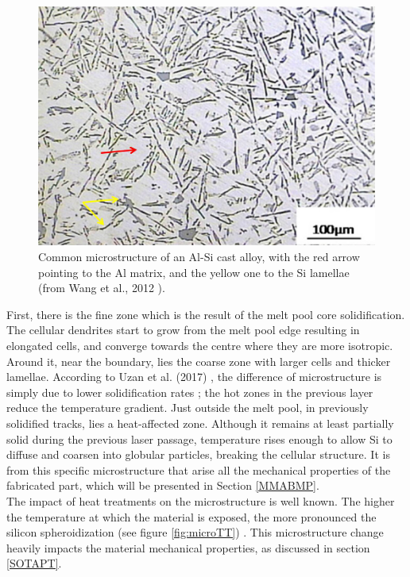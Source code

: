 \begin{figure}[ht]
	\centering
	\includegraphics[scale=0.30]{Images/micro_cast}
	\decoRule
	\caption[Common microstructure of an Al-Si cast alloy]{Common microstructure of an Al-Si cast alloy, with the red arrow pointing to the Al matrix, and the yellow one to the Si lamellae (from Wang et al., 2012 \parencite{Wang12}).}
	\label{fig:micro_cast}
\end{figure}

First, there is the fine zone which is the result of the melt pool core solidification. The cellular dendrites start to grow from the melt pool edge resulting in elongated  cells, and converge towards the centre where they are more isotropic. Around it, near the boundary, lies the coarse zone with larger cells and thicker lamellae. According to Uzan et al. (2017) \cite{UZAN2017229}, the difference of microstructure is simply due to lower solidification rates ; the hot zones in the previous layer reduce the temperature gradient. Just outside the melt pool, in previously solidified tracks, lies a heat-affected zone. Although it remains at least partially solid during the previous laser passage, temperature rises enough to allow Si to diffuse and coarsen into globular particles, breaking the cellular structure. It is from this specific microstructure that arise all the mechanical properties of the fabricated part, which will be presented in Section \ref{MMABMP}.\\

The impact of heat treatments on the microstructure is well known. The higher the temperature at which the material is exposed, the more pronounced the silicon spheroidization (see figure \ref{fig:microTT}) \parencite{aboulkhair2017}. This microstructure change heavily impacts the material mechanical properties, as discussed in section \ref{SOTAPT}.\\


